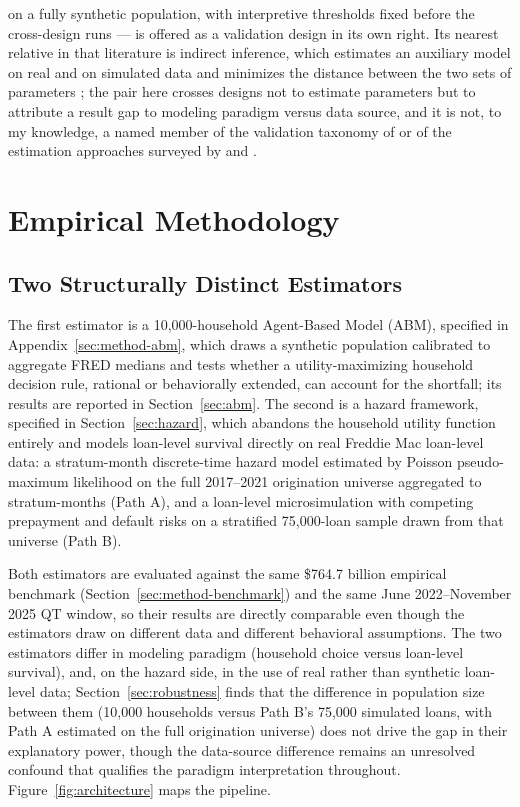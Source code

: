 \documentclass[12pt]{article}
\begin{document}
on a fully synthetic population, with interpretive thresholds fixed before the cross-design runs --- is offered as a validation design in its own right. Its nearest relative in that literature is indirect inference, which estimates an auxiliary model on real and on simulated data and minimizes the distance between the two sets of parameters \citep{platt2020}; the pair here crosses designs not to estimate parameters but to attribute a result gap to modeling paradigm versus data source, and it is not, to my knowledge, a named member of the validation taxonomy of \citet{fagiolo2007} or of the estimation approaches surveyed by \citet{grazzini2017} and \citet{platt2020}.

\section{Empirical Methodology}\label{sec:method}

\subsection{Two Structurally Distinct Estimators}\label{sec:method-estimators}

The first estimator is a 10,000-household Agent-Based Model (ABM), specified in Appendix~\ref{sec:method-abm}, which draws a synthetic population calibrated to aggregate FRED medians and tests whether a utility-maximizing household decision rule, rational or behaviorally extended, can account for the shortfall; its results are reported in Section~\ref{sec:abm}. The second is a hazard framework, specified in Section~\ref{sec:hazard}, which abandons the household utility function entirely and models loan-level survival directly on real Freddie Mac loan-level data: a stratum-month discrete-time hazard model estimated by Poisson pseudo-maximum likelihood on the full 2017--2021 origination universe aggregated to stratum-months (Path A), and a loan-level microsimulation with competing prepayment and default risks on a stratified 75,000-loan sample drawn from that universe (Path B).

Both estimators are evaluated against the same \$764.7 billion empirical benchmark (Section~\ref{sec:method-benchmark}) and the same June 2022--November 2025 QT window, so their results are directly comparable even though the estimators draw on different data and different behavioral assumptions. The two estimators differ in modeling paradigm (household choice versus loan-level survival), and, on the hazard side, in the use of real rather than synthetic loan-level data; Section~\ref{sec:robustness} finds that the difference in population size between them (10,000 households versus Path B's 75,000 simulated loans, with Path A estimated on the full origination universe) does not drive the gap in their explanatory power, though the data-source difference remains an unresolved confound that qualifies the paradigm interpretation throughout. Figure~\ref{fig:architecture} maps the pipeline.
\end{document}
